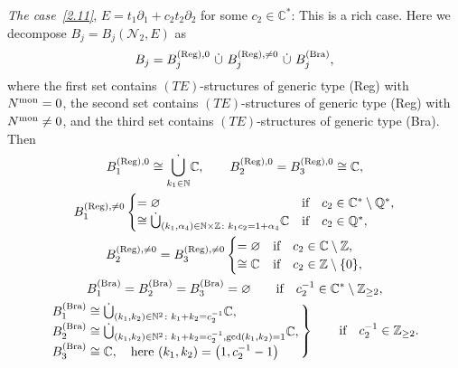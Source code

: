 \documentclass[10pt,a4paper]{amsart}
\numberwithin{equation}{section}
\numberwithin{figure}{section}
\newcommand{\N}{{\mathbb N}}
\newcommand{\Z}{{\mathbb Z}}
\newcommand{\Q}{{\mathbb Q}}
\newcommand{\C}{{\mathbb C}}
\newcommand{\NN}{{\mathcal N}}
\newcommand{\paa}{\partial}
\begin{document}
\begin{Remarks}
\begin{enumerate}
{\it The case~\eqref{2.11}}, $E=t_1\paa_1+c_2t_2\paa_2$
for some $c_2\in\C^*$: This is a rich case. Here we
decompose $B_j=B_j(\NN_2,E)$ as
\begin{gather*}%
B_j=B_j^{({\rm Reg}),0}
\ \dot\cup\ B_j^{({\rm Reg}),\neq 0}
\ \dot\cup\ B_j^{({\rm Bra})},
\end{gather*}
where the first set contains $(TE)$-structures of generic
type (Reg) with $N^{\rm mon}=0$, the second set contains
$(TE)$-structures of generic type (Reg) with $N^{\rm mon}\neq 0$,
and the third set contains $(TE)$-structures of
generic type (Bra). Then
\begin{gather*}%
B_1^{({\rm Reg}),0}\cong \dot{\bigcup\limits_{k_1\in\N}}\C,\qquad
B_2^{({\rm Reg}),0}=B_3^{({\rm Reg}),0}\cong\C,
\\
B_1^{({\rm Reg}),\neq 0}
\begin{cases}
=\varnothing&\text{if}\quad c_2\in\C^*\setminus\Q^*,
\\
\cong\dot\bigcup_{(k_1,\alpha_4)\in\N\times\Z\colon k_1c_2=1+\alpha_4}\C
&\text{if}\quad c_2\in\Q^*,
\end{cases} %
\\
B_2^{({\rm Reg}),\neq 0}=B_3^{({\rm Reg}),\neq 0}
\begin{cases}
=\varnothing&\text{if}\quad c_2\in\C\setminus\Z,
\\
\cong \C&\text{if}\quad c_2\in\Z\setminus\{0\},
\end{cases}
\\%
B_1^{({\rm Bra})}=B_2^{({\rm Bra})}=B_3^{({\rm Bra})}=\varnothing
\qquad\text{if}\quad c_2^{-1}\in\C^*\setminus \Z_{\geq 2},
\\
\left.\!\!\! \begin{array}{l}
B_1^{({\rm Bra})} \cong\dot
\bigcup_{(k_1,k_2)\in\N^2\colon k_1+k_2=c_2^{-1}}\C,\\
B_2^{({\rm Bra})} \cong\dot
\bigcup_{(k_1,k_2)\in\N^2\colon k_1+k_2=c_2^{-1},\gcd(k_1,k_2)=1}
\C,\\
B_3^{({\rm Bra})} \cong\C,\quad\text{here }(k_1,k_2)=\big(1,c_2^{-1}-1\big)
\end{array}\!\!\right\}\qquad\text{if}\quad c_2^{-1}\in \Z_{\geq 2}.
\nonumber
\end{gather*}
\end{enumerate}
\end{Remarks}
\end{document}
